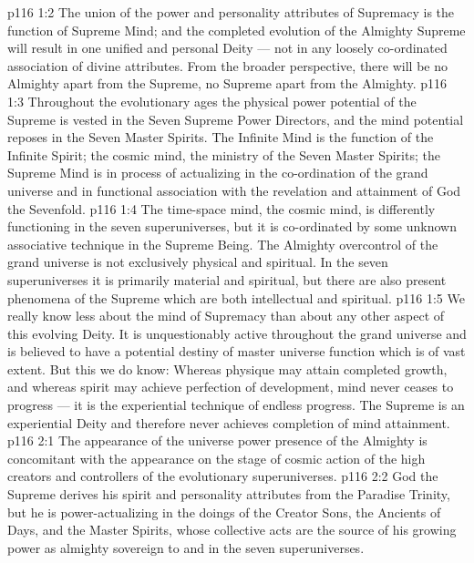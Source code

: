 \vs p116 1:2 The union of the power and personality attributes of Supremacy is the function of Supreme Mind; and the completed evolution of the Almighty Supreme will result in one unified and personal Deity --- not in any loosely co\hyp{}ordinated association of divine attributes. From the broader perspective, there will be no Almighty apart from the Supreme, no Supreme apart from the Almighty.
\vs p116 1:3 Throughout the evolutionary ages the physical power potential of the Supreme is vested in the Seven Supreme Power Directors, and the mind potential reposes in the Seven Master Spirits. The Infinite Mind is the function of the Infinite Spirit; the cosmic mind, the ministry of the Seven Master Spirits; the Supreme Mind is in process of actualizing in the co\hyp{}ordination of the grand universe and in functional association with the revelation and attainment of God the Sevenfold.
\vs p116 1:4 \pc The time\hyp{}space mind, the cosmic mind, is differently functioning in the seven superuniverses, but it is co\hyp{}ordinated by some unknown associative technique in the Supreme Being. The Almighty overcontrol of the grand universe is not exclusively physical and spiritual. In the seven superuniverses it is primarily material and spiritual, but there are also present phenomena of the Supreme which are both intellectual and spiritual.
\vs p116 1:5 We really know less about the mind of Supremacy than about any other aspect of this evolving Deity. It is unquestionably active throughout the grand universe and is believed to have a potential destiny of master universe function which is of vast extent. But this we do know: Whereas physique may attain completed growth, and whereas spirit may achieve perfection of development, mind never ceases to progress --- it is the experiential technique of endless progress. The Supreme is an experiential Deity and therefore never achieves completion of mind attainment.
\vs p116 2:1 The appearance of the universe power presence of the Almighty is concomitant with the appearance on the stage of cosmic action of the high creators and controllers of the evolutionary superuniverses.
\vs p116 2:2 God the Supreme derives his spirit and personality attributes from the Paradise Trinity, but he is power\hyp{}actualizing in the doings of the Creator Sons, the Ancients of Days, and the Master Spirits, whose collective acts are the source of his growing power as almighty sovereign to and in the seven superuniverses.
